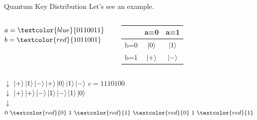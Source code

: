 \documentclass{beamer}
\begin{document}
\begin{frame}{Quantum Key Distribution}
    Let's see an example.
    \begin{center}
        \begin{columns}
            \centering
            \begin{math}
                a = \textcolor{blue}{0110011}
            \end{math}\vfill  
            \begin{math}
                b = \textcolor{red}{1011001}
            \end{math}\vfill
            \centering
                \begin{tabular}{|l|c c|}
                    \hline
                     & a=0 & a=1 \\
                    \hline
                    b=0 & $\ket{0}$ & $\ket{1}$ \\
                    b=1 & $\ket{+}$ & $\ket{-}$ \\
                    \hline
                \end{tabular}
        \end{columns}
        \begin{math}
            \downarrow
        \end{math}\vfill
        \begin{math}
            \ket{+}\ket{1}\ket{-}\ket{+}\ket{0}\ket{1}\ket{-}
        \end{math}\vfill
        \pause
        \begin{math}
            c = 1110100
        \end{math}\\
        \pause
        \begin{math}
            \downarrow
        \end{math}\vfill
        \begin{math}
            \ket{+}\ket{+}\ket{-}\ket{1}\ket{-}\ket{1}\ket{0}
        \end{math}\\
        \begin{math}
            \downarrow
        \end{math}\vfill
        \pause
        \begin{math}
            0\ \textcolor{red}{0}\ 1\ \textcolor{red}{1}\ \textcolor{red}{0}\ 1\ \textcolor{red}{1}
        \end{math}
    \end{center}
    
\end{frame}
\end{document}
